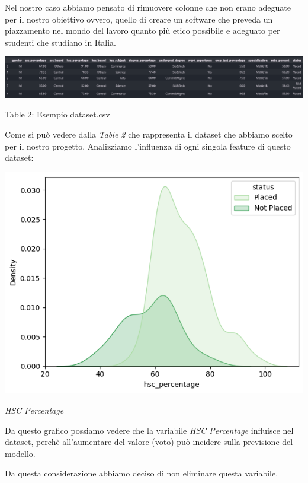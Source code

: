 \documentclass[12pt]{article}
\begin{document}
Nel nostro caso abbiamo pensato di rimuovere colonne che non erano adeguate per il nostro obiettivo ovvero, quello di creare
un software che preveda un piazzamento nel mondo del lavoro quanto più etico possibile e adeguato per studenti che studiano in
Italia.

\begin{center}
    \includegraphics[scale=0.46]{csvimage.png}

    Table 2: Esempio dataset.csv
\end{center}

Come si può vedere dalla \textit{Table 2} che rappresenta il dataset che abbiamo scelto per il nostro progetto.
Analizziamo l'influenza di ogni singola feature di questo dataset:

\begin{center}
    \includegraphics[scale=0.5]{hscpercentage.png}

    \textit{HSC Percentage}
\end{center}

Da questo grafico possiamo vedere che la variabile \textit{HSC Percentage} influisce nel dataset, perchè all'aumentare del valore (voto) 
può incidere sulla previsione del modello.

Da questa considerazione abbiamo deciso di non eliminare questa variabile.
\end{document}
